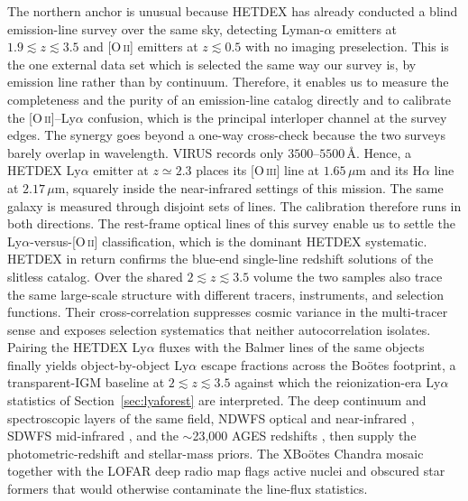 \documentclass[10pt,onecolumn]{article}
\begin{document}
The northern anchor is unusual because HETDEX \cite{hetdex2021} has already conducted a blind emission-line survey over the same sky, detecting Lyman-$\alpha$ emitters at $1.9\lesssim z\lesssim3.5$ and [O\,\textsc{ii}] emitters at $z\lesssim0.5$ with no imaging preselection. This is the one external data set which is selected the same way our survey is, by emission line rather than by continuum. Therefore, it enables us to measure the completeness and the purity of an emission-line catalog directly and to calibrate the [O\,\textsc{ii}]--Ly$\alpha$ confusion, which is the principal interloper channel at the survey edges. The synergy goes beyond a one-way cross-check because the two surveys barely overlap in wavelength. VIRUS records only $3500$--$5500$\,\AA. Hence, a HETDEX Ly$\alpha$ emitter at $z\simeq2.3$ places its [O\,\textsc{iii}] line at $1.65\,\mu$m and its H$\alpha$ line at $2.17\,\mu$m, squarely inside the near-infrared settings of this mission. The same galaxy is measured through disjoint sets of lines. The calibration therefore runs in both directions. The rest-frame optical lines of this survey enable us to settle the Ly$\alpha$-versus-[O\,\textsc{ii}] classification, which is the dominant HETDEX systematic. HETDEX in return confirms the blue-end single-line redshift solutions of the slitless catalog. Over the shared $2\lesssim z\lesssim3.5$ volume the two samples also trace the same large-scale structure with different tracers, instruments, and selection functions. Their cross-correlation suppresses cosmic variance in the multi-tracer sense \cite{mcdonaldseljak2009} and exposes selection systematics that neither autocorrelation isolates. Pairing the HETDEX Ly$\alpha$ fluxes with the Balmer lines of the same objects finally yields object-by-object Ly$\alpha$ escape fractions across the Bo\"otes footprint, a transparent-IGM baseline at $2\lesssim z\lesssim3.5$ against which the reionization-era Ly$\alpha$ statistics of Section~\ref{sec:lyaforest} are interpreted. The deep continuum and spectroscopic layers of the same field, NDWFS optical and near-infrared \cite{jannuzi1999}, SDWFS mid-infrared \cite{ashby2009}, and the $\sim$23{,}000 AGES redshifts \cite{kochanek2012}, then supply the photometric-redshift and stellar-mass priors. The XBo\"otes Chandra mosaic \cite{murray2005} together with the LOFAR deep radio map \cite{tasse2021} flags active nuclei and obscured star formers that would otherwise contaminate the line-flux statistics.
\end{document}
